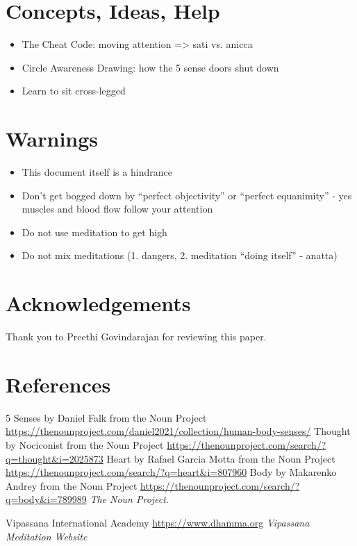 \documentclass[a4paper, amsfonts, amssymb, amsmath, reprint, showkeys, nofootinbib, twoside]{revtex4-1}
\begin{document}
\section{Concepts, Ideas, Help}

\begin{itemize}
  \item The Cheat Code: moving attention => sati vs. anicca
  \item Circle Awareness Drawing: how the 5 sense doors shut down
  \item Learn to sit cross-legged
\end{itemize}


\section{Warnings}

\begin{itemize}
  \item This document itself is a hindrance
  \item Don't get bogged down by ``perfect objectivity'' or ``perfect equanimity'' - yes muscles and blood flow follow your attention
  \item Do not use meditation to get high
  \item Do not mix meditations (1. dangers, 2. meditation ``doing itself'' - anatta)
\end{itemize}


\section*{Acknowledgements}

Thank you to Preethi Govindarajan for reviewing this paper.


\section*{References}

\begin{thebibliography}{99}

  5 Senses by Daniel Falk from the Noun Project
  \url{https://thenounproject.com/daniel2021/collection/human-body-senses/}
  Thought by Nociconist from the Noun Project
  \url{https://thenounproject.com/search/?q=thought&i=2025873}
  Heart by Rafael Garcia Motta from the Noun Project
  \url{https://thenounproject.com/search/?q=heart&i=807960}
  Body by Makarenko Andrey from the Noun Project
  \url{https://thenounproject.com/search/?q=body&i=789989}
  \textit{The Noun Project}.

  Vipassana International Academy
  \url{https://www.dhamma.org}
  \textit{Vipassana Meditation Website}


\end{thebibliography}
\end{document}

